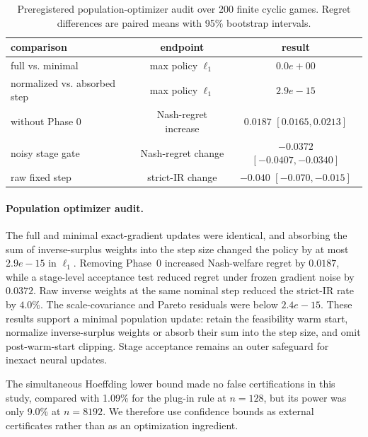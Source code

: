 \begin{table}[t]
\centering\footnotesize
\caption{Preregistered population-optimizer audit over 200 finite cyclic games. Regret differences are paired means with 95\% bootstrap intervals.}
\label{tab:synthetic-simplification}
\begin{tabular}{lcc}
\toprule
comparison & endpoint & result \\
\midrule
full vs. minimal & max policy $\ell_1$ & $0.0e+00$ \\
normalized vs. absorbed step & max policy $\ell_1$ & $2.9e-15$ \\
without Phase 0 & Nash-regret increase & $0.0187$ $[0.0165,0.0213]$ \\
noisy stage gate & Nash-regret change & $-0.0372$ $[-0.0407,-0.0340]$ \\
raw fixed step & strict-IR change & $-0.040$ $[-0.070,-0.015]$ \\
\bottomrule
\end{tabular}
\end{table}

\paragraph{Population optimizer audit.}
The full and minimal exact-gradient updates were identical, and absorbing the
sum of inverse-surplus weights into the step size changed the policy by at most
$2.9e-15$ in $\ell_1$. Removing Phase~0 increased
Nash-welfare regret by $0.0187$, while a stage-level acceptance test
reduced regret under frozen gradient noise by $0.0372$. Raw
inverse weights at the same nominal step reduced the strict-IR rate by
$4.0\%$. The scale-covariance and Pareto residuals were below
$2.4e-15$. These results support a minimal population update:
retain the feasibility warm start, normalize inverse-surplus weights or absorb
their sum into the step size, and omit post-warm-start clipping. Stage
acceptance remains an outer safeguard for inexact neural updates.

The simultaneous Hoeffding lower bound made no false certifications in this
study, compared with 1.09\% for the plug-in
rule at $n=128$, but its power was only 9.0\% at
$n=8192$. We therefore use confidence bounds as external certificates rather
than as an optimization ingredient.
